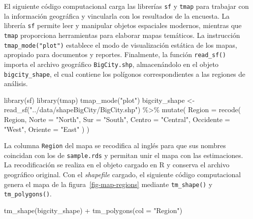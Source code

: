 \documentclass[
  spanish,
  11pt,
  letterpaper,
  oneside,
  open=any]{scrbook}
\newenvironment{Shaded}{\begin{snugshade}}{\end{snugshade}}
\newcommand{\AttributeTok}[1]{\textcolor[rgb]{0.40,0.45,0.13}{#1}}
\newcommand{\FunctionTok}[1]{\textcolor[rgb]{0.28,0.35,0.67}{#1}}
\newcommand{\NormalTok}[1]{\textcolor[rgb]{0.00,0.23,0.31}{#1}}
\newcommand{\OtherTok}[1]{\textcolor[rgb]{0.00,0.23,0.31}{#1}}
\newcommand{\SpecialCharTok}[1]{\textcolor[rgb]{0.37,0.37,0.37}{#1}}
\newcommand{\StringTok}[1]{\textcolor[rgb]{0.13,0.47,0.30}{#1}}
\begin{document}
El siguiente código computacional carga las librerías \texttt{sf} y
\texttt{tmap} para trabajar con la información geográfica y vincularla
con los resultados de la encuesta. La librería \texttt{sf} permite leer
y manipular objetos espaciales modernos, mientras que \texttt{tmap}
proporciona herramientas para elaborar mapas temáticos. La instrucción
\texttt{tmap\_mode("plot")} establece el modo de visualización estática
de los mapas, apropiado para documentos y reportes. Finalmente, la
función \texttt{read\_sf()} importa el archivo geográfico
\texttt{BigCity.shp}, almacenándolo en el objeto
\texttt{bigcity\_shape}, el cual contiene los polígonos correspondientes
a las regiones de análisis.

\begin{Shaded}
\begin{Highlighting}[]
\FunctionTok{library}\NormalTok{(sf)}
\FunctionTok{library}\NormalTok{(tmap)}
\FunctionTok{tmap\_mode}\NormalTok{(}\StringTok{"plot"}\NormalTok{)}
\NormalTok{bigcity\_shape }\OtherTok{\textless{}{-}} \FunctionTok{read\_sf}\NormalTok{(}\StringTok{"../data/shapeBigCity/BigCity.shp"}\NormalTok{) }\SpecialCharTok{\%\textgreater{}\%}
  \FunctionTok{mutate}\NormalTok{(}
    \AttributeTok{Region =} \FunctionTok{recode}\NormalTok{(}
\NormalTok{      Region,}
      \AttributeTok{Norte =} \StringTok{"North"}\NormalTok{,}
      \AttributeTok{Sur =} \StringTok{"South"}\NormalTok{,}
      \AttributeTok{Centro =} \StringTok{"Central"}\NormalTok{,}
      \AttributeTok{Occidente =} \StringTok{"West"}\NormalTok{,}
      \AttributeTok{Oriente =} \StringTok{"East"}
\NormalTok{    )}
\NormalTok{  )}
\end{Highlighting}
\end{Shaded}

La columna \texttt{Region} del mapa se recodifica al inglés para que sus
nombres coincidan con los de \texttt{sample.rds} y permitan unir el mapa
con las estimaciones. La recodificación se realiza en el objeto cargado
en R y conserva el archivo geográfico original. Con el \emph{shapefile}
cargado, el siguiente código computacional genera el mapa de la
figura~\ref{fig-map-regions} mediante \texttt{tm\_shape()} y
\texttt{tm\_polygons()}.

\begin{Shaded}
\begin{Highlighting}[]
\FunctionTok{tm\_shape}\NormalTok{(bigcity\_shape) }\SpecialCharTok{+}
  \FunctionTok{tm\_polygons}\NormalTok{(}\AttributeTok{col =} \StringTok{"Region"}\NormalTok{)}
\end{Highlighting}
\end{Shaded}
\end{document}

